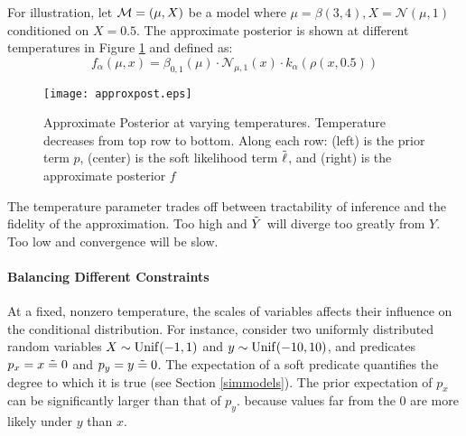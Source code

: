 For illustration, let ${\mathcal{M}} = (\mu, X)$ be a model where $\mu = \beta(3, 4), X = \mathcal{N}(\mu, 1)$  conditioned on $X = 0.5$.
The approximate posterior is shown at different temperatures in Figure \ref{temppost} and defined as:
\begin{equation}\label{approxposterior}
f_\alpha(\mu, x) = \beta_{0,1}(\mu) \cdot \mathcal{N}_{\mu,1}(x) \cdot k_\alpha(\rho(x, 0.5)) 
\end{equation}

\begin{figure}
\texttt{[image: approxpost.eps]}
\caption{Approximate Posterior at varying temperatures.  Temperature decreases from top row to bottom.  Along each row: (left) is the prior term $p$, (center) is the soft likelihood term $\tilde{\operatorname{\ell}}$, and (right) is the approximate posterior $f$}
\label{temppost}
\end{figure}

The temperature parameter trades off between tractability of inference and the fidelity of the approximation.
Too high and $\tilde{Y}$ will diverge too greatly from $Y$. Too low and convergence will be slow.

\paragraph{Balancing Different Constraints}
At a fixed, nonzero temperature, the scales of variables affects their influence on
the conditional distribution.
For instance, consider two uniformly distributed random variables $X \sim \operatorname{Unif}(-1, 1)$ and $y \sim \operatorname{Unif}(-10, 10)$,
and predicates $p_x = x \mathrel{\tilde{=}} 0$ and $p_y = y \mathrel{\tilde{=}} 0$.
The expectation of a soft predicate quantifies the degree to which it is true (see Section \ref{simmodels}).
The prior expectation of $p_x$ can be significantly larger than that of $p_y$.
because values far from the 0 are more likely under $y$ than $x$.

